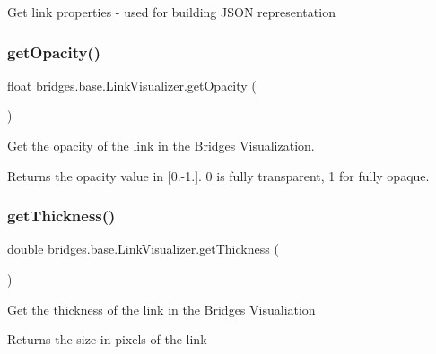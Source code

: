 Get link properties -\/ used for building J\+S\+ON representation \mbox{\label{classbridges_1_1base_1_1_link_visualizer_a07cdd435a54e4b612ad63614f2a27a4a}} 
\subsubsection{\texorpdfstring{get\+Opacity()}{getOpacity()}}
{\footnotesize\ttfamily float bridges.\+base.\+Link\+Visualizer.\+get\+Opacity (\begin{DoxyParamCaption}{ }\end{DoxyParamCaption})}



Get the opacity of the link in the Bridges Visualization. 

\begin{DoxyReturn}{Returns}
the opacity value in \mbox{[}0.-\/1.\mbox{]}. 0 is fully transparent, 1 for fully opaque. 
\end{DoxyReturn}
\mbox{\label{classbridges_1_1base_1_1_link_visualizer_af1592d2a8664b00c1a51fdc0f8d1860a}} 
\subsubsection{\texorpdfstring{get\+Thickness()}{getThickness()}}
{\footnotesize\ttfamily double bridges.\+base.\+Link\+Visualizer.\+get\+Thickness (\begin{DoxyParamCaption}{ }\end{DoxyParamCaption})}

Get the thickness of the link in the Bridges Visualiation

\begin{DoxyReturn}{Returns}
the size in pixels of the link 
\end{DoxyReturn}
\mbox{\label{classbridges_1_1base_1_1_link_visualizer_a92f306dbd73b961befa8ab4c0620a89e}} 
